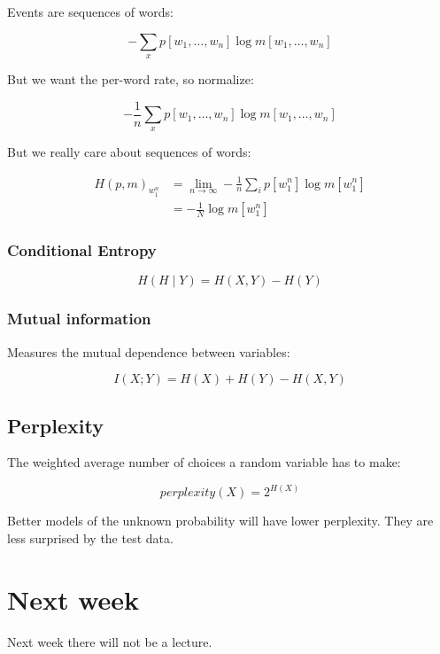 \documentclass{idc_msc}
\begin{document}
Events are sequences of words:

\[
  -\sum_{x} p[w_1,\ldots,w_n] \log m[w_1,\ldots,w_n]
\]

But we want the per-word rate, so normalize:

\[
  - \frac{1}{n} \sum_{x} p[w_1,\ldots,w_n] \log m[w_1,\ldots,w_n]
\]

But we really care about sequences of words:

\[
\begin{aligned}
  H(p,m)_{w_1^n} &= \lim_{n \to \infty} - \frac{1}{n} \sum_{i} p[w_1^n] \log m[w_1^n] \\
  &= - \frac{1}{N} \log m[w_1^n]
\end{aligned}
\]

\subsubsection{Conditional Entropy}

\[
  H(H \mid Y) = H(X,Y) - H(Y)
\]

\subsubsection{Mutual information}

Measures the mutual dependence between variables:

\[
  I(X; Y) = H(X) + H(Y) - H(X, Y)
\]

\subsection{Perplexity}

The weighted average number of choices a random variable has to make:

\[\textit{perplexity}(X) = 2^{H(X)}\]

Better models of the unknown probability will have lower perplexity.
They are less surprised by the test data.

\section{Next week}

Next week there will not be a lecture.
\end{document}
